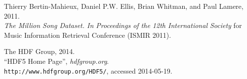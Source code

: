 \begin{thebibliography}{10}

Thierry Bertin-Mahieux, Daniel P.W. Ellis, Brian Whitman, and Paul Lamere,
2011.\\
\emph{The Million Song Dataset. In Proceedings of the 12th International Society}
for Music Information Retrieval Conference (ISMIR 2011).

The HDF Group,
2014.\\
``HDF5 Home Page'',
\emph{hdfgroup.org}.\\
\verb+http://www.hdfgroup.org/HDF5/+, accessed 2014-05-19.

\end{thebibliography}